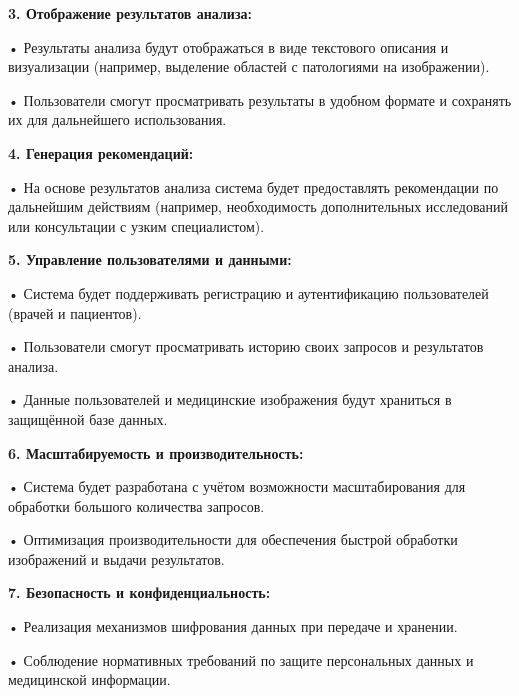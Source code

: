 {  \par \redline \textbf{3. Отображение результатов анализа:}
  \par \redline \hspace{0.3cm} • Результаты анализа будут отображаться в виде текстового описания и визуализации (например, выделение областей с патологиями на изображении).
  \par \redline \hspace{0.3cm} • Пользователи смогут просматривать результаты в удобном формате и сохранять их для дальнейшего использования.

  \par \redline \textbf{4. Генерация рекомендаций:}
  \par \redline \hspace{0.3cm} • На основе результатов анализа система будет предоставлять рекомендации по дальнейшим действиям (например, необходимость дополнительных исследований или консультации с узким специалистом).

  \par \redline \textbf{5. Управление пользователями и данными:}
  \par \redline \hspace{0.3cm} • Система будет поддерживать регистрацию и аутентификацию пользователей (врачей и пациентов).
  \par \redline \hspace{0.3cm} • Пользователи смогут просматривать историю своих запросов и результатов анализа.
  \par \redline \hspace{0.3cm} • Данные пользователей и медицинские изображения будут храниться в защищённой базе данных.

  \par \redline \textbf{6. Масштабируемость и производительность:}
  \par \redline \hspace{0.3cm} • Система будет разработана с учётом возможности масштабирования для обработки большого количества запросов.
  \par \redline \hspace{0.3cm} • Оптимизация производительности для обеспечения быстрой обработки изображений и выдачи результатов.

  \par \redline \textbf{7. Безопасность и конфиденциальность:}
  \par \redline \hspace{0.3cm} • Реализация механизмов шифрования данных при передаче и хранении.
  \par \redline \hspace{0.3cm} • Соблюдение нормативных требований по защите персональных данных и медицинской информации.

}
